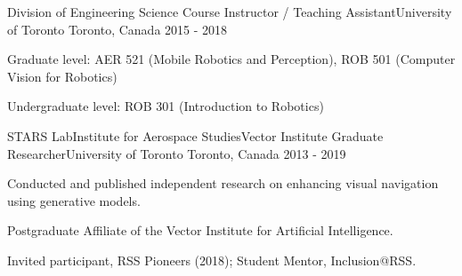 \begin{cventries}
  \cventry
    {Division of Engineering Science} %
    {Course Instructor / Teaching Assistant{\awesomesep}University of Toronto} %
    {Toronto, Canada} %
    {2015 - 2018} %
    {
      \begin{cvitems} %
        \item {Graduate level: AER 521 (Mobile Robotics and Perception), ROB 501 (Computer Vision for Robotics)}
        \item {Undergraduate level: ROB 301 (Introduction to Robotics)}
      \end{cvitems}
    }
  
  \cventry
    {STARS Lab{\awesomesep}Institute for Aerospace Studies{\awesomesep}Vector Institute} %
    {Graduate Researcher{\awesomesep}University of Toronto} %
    {Toronto, Canada} %
    {2013 - 2019} %
    {
      \begin{cvitems} %
        \item {Conducted and published independent research on enhancing visual navigation using generative models.}
		\item {Postgraduate Affiliate of the Vector Institute for Artificial Intelligence.}
		\item {Invited participant, RSS Pioneers (2018); Student Mentor, Inclusion@RSS.}
      \end{cvitems}
    }

%  

\end{cventries}
